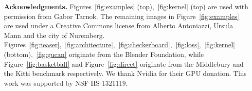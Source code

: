 \documentclass[10pt,twocolumn,letterpaper]{article}
\begin{document}
\vspace{0.05in}
\noindent\textbf{Acknowledgments.}
Figures~\ref{fig:examples} (top),~\ref{fig:kernel} (top) are used with permission from Gabor Tarnok. The remaining images in Figure~\ref{fig:examples} are used under a Creative Commons license from Alberto Antoniazzi, Ursula Mann and the city of Nuremberg. Figures~\ref{fig:teaser},~\ref{fig:architecture},~\ref{fig:checkerboard},~\ref{fig:loss},~\ref{fig:kernel} (bottom),~\ref{fig:gucan} originate from the Blender Foundation, while Figure~\ref{fig:basketball} and Figure~\ref{fig:direct} originate from the Middlebury and the Kitti benchmark respectively. We thank Nvidia for their GPU donation. This work was supported by NSF IIS-1321119.

{\small


}
\end{document}
